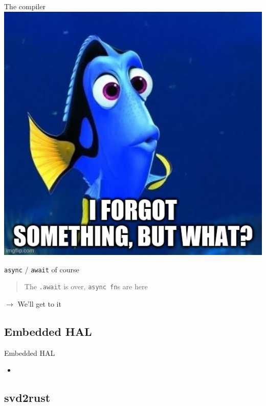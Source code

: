 \documentclass[aspectratio=1610,14pt,t]{beamer}
\begin{document}
\begin{frame}[c]{The compiler}
  \includegraphics[height=0.8\textheight]{img/did-i-forget-something.jpg}
\end{frame}

\begin{frame}[c]{\texttt{async} / \texttt{await} of course}

  \begin{quote}
    The \texttt{.await} is over, \texttt{async fn}s are here
  \end{quote}

  $\rightarrow$ We'll get to it
\end{frame}

\subsection{Embedded HAL}

\begin{frame}[c]{Embedded HAL}
  \begin{itemize}
  \item
  \end{itemize}
\end{frame}

\subsection{svd2rust}
\end{document}
